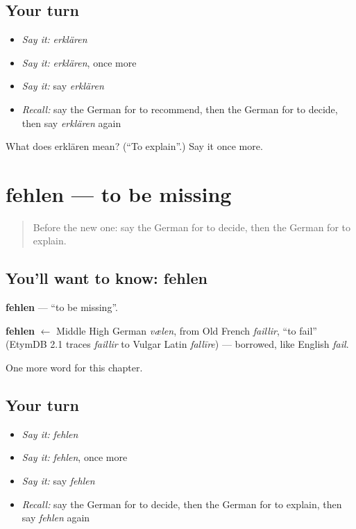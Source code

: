 \subsection*{Your turn}
\begin{itemize}
\raggedright
  \item \emph{Say it:} \emph{erklären}
  \item \emph{Say it:} \emph{erklären}, once more
  \item \emph{Say it:} say \emph{erklären}
  \item \emph{Recall:} say the German for to recommend, then the German for to decide, then say \emph{erklären} again
\end{itemize}

\begin{tcolorbox}[breakable,colback=teal!4,colframe=teal!35!black,title={Before you move on}]
What does erklären mean? (\textquotedblleft{}To explain\textquotedblright{}.) Say it once more.
\end{tcolorbox}
\section[fehlen]{fehlen — to be missing}

\label{lesson:GE-C146-fehlen}



\begin{quote}
Before the new one: say the German for to decide, then the German for to explain.
\end{quote}

\subsection*{You'll want to know: fehlen}
\textbf{fehlen} — \textquotedblleft{}to be missing\textquotedblright{}.

\begin{cousinweb}
\textbf{fehlen} $\leftarrow$ Middle High German \emph{vælen}, from Old French \emph{faillir}, \textquotedblleft{}to fail\textquotedblright{} (EtymDB 2.1 traces \emph{faillir} to Vulgar Latin \emph{fallīre}) — borrowed, like English \emph{fail}.
\end{cousinweb}

\begin{grammarlens}[title={What you've built}]
One more word for this chapter.
\end{grammarlens}

\subsection*{Your turn}
\begin{itemize}
\raggedright
  \item \emph{Say it:} \emph{fehlen}
  \item \emph{Say it:} \emph{fehlen}, once more
  \item \emph{Say it:} say \emph{fehlen}
  \item \emph{Recall:} say the German for to decide, then the German for to explain, then say \emph{fehlen} again
\end{itemize}

